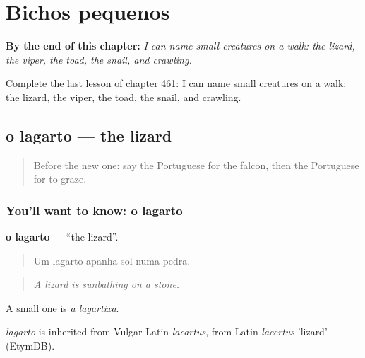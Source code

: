 
\chapter{Bichos pequenos}
\label{ch:pt-bichos-pequenos}

\begin{chapteropening}
\textbf{By the end of this chapter:} \emph{I can name small creatures on a walk: the lizard, the viper, the toad, the snail, and crawling.}

Complete the last lesson of chapter 461: I can name small creatures on a walk: the lizard, the viper, the toad, the snail, and crawling.
\end{chapteropening}

\section[o lagarto]{o lagarto — the lizard}

\label{lesson:PT-C461-lagarto}



\begin{quote}
Before the new one: say the Portuguese for the falcon, then the Portuguese for to graze.
\end{quote}

\subsection*{You'll want to know: o lagarto}
\textbf{o lagarto} — \textquotedblleft{}the lizard\textquotedblright{}.

\begin{quote}
Um lagarto apanha sol numa pedra.
\end{quote}

\begin{quote}
\emph{A lizard is sunbathing on a stone.}
\end{quote}

A small one is \emph{a lagartixa}.

\begin{cousinweb}
\emph{lagarto} is inherited from Vulgar Latin \emph{lacartus}, from Latin \emph{lacertus} 'lizard' (EtymDB).
\end{cousinweb}

